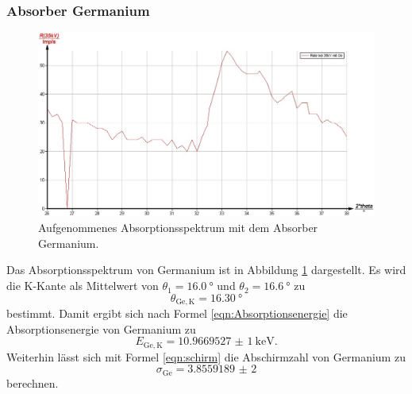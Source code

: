 \subsubsection{Absorber Germanium}
\begin{figure}
	\includegraphics[width=1.0\textwidth]{nIKO_und_jULIAN_ÜLADS/germanium.jpg}
	\caption{Aufgenommenes Absorptionsspektrum mit dem Absorber Germanium.}
	\label{fig:germanium_absorber}
\end{figure}
Das Absorptionsspektrum von Germanium ist in Abbildung \ref{fig:germanium_absorber}
dargestellt. Es wird die K-Kante als Mittelwert von $\theta_1 = \SI{16,0}{\degree}$ und
$\theta_2 = \SI{16,6}{\degree}$ zu
\begin{equation*}
	\theta_{\mathrm{Ge,K}} = \SI{16,30}{\degree}
\end{equation*}
bestimmt. Damit ergibt sich nach Formel \eqref{eqn:Absorptionsenergie} die Absorptionsenergie
von Germanium zu
\begin{equation*}
	E_{\mathrm{Ge,K}} = \SI{10,9669527(1)}{\kilo\electronvolt} \mathrm{.}
\end{equation*}
Weiterhin lässt sich mit Formel \eqref{eqn:schirm} die Abschirmzahl von Germanium zu
\begin{equation*}
	\sigma_{\mathrm{Ge}} = \num{3,8559189(2)}
\end{equation*}
berechnen.

\FloatBarrier
